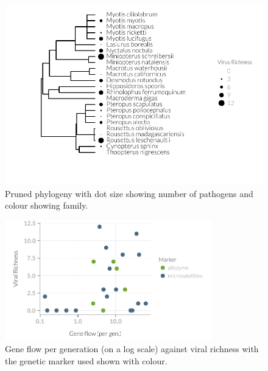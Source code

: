 \begin{knitrout}\footnotesize
{}\color{fgcolor}\begin{figure}[t]

{\centering \includegraphics[width=\textwidth]{figure/fstTreePlot-1} 

}

\caption[Pruned phylogeny with dot size showing number of pathogens and colour showing family]{Pruned phylogeny with dot size showing number of pathogens and colour showing family.}\label{fig:fstTreePlot}
\end{figure}


\end{knitrout}

\begin{knitrout}\footnotesize
{}\color{fgcolor}\begin{figure}[t]

{\centering \includegraphics[width=0.8\textwidth]{figure/fstRawData-1} 

}

\caption[Gene flow per generation (on a log scale) against viral richness with the genetic marker used shown with colour]{Gene flow per generation (on a log scale) against viral richness with the genetic marker used shown with colour.}\label{fig:fstRawData}
\end{figure}


\end{knitrout}













